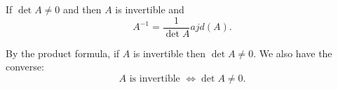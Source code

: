 \begin{corollary}
    If $\det A \not = 0$ and then $A$ is invertible and
    \[A^{-1} = \frac{1}{\det A} ajd (A).\]
\end{corollary}

\begin{remark}
    By the product formula, if $A$ is invertible then $\det A \not = 0$. We also have the converse:
    \[A \text{ is invertible } \iff \det A \not = 0.\]
\end{remark}

